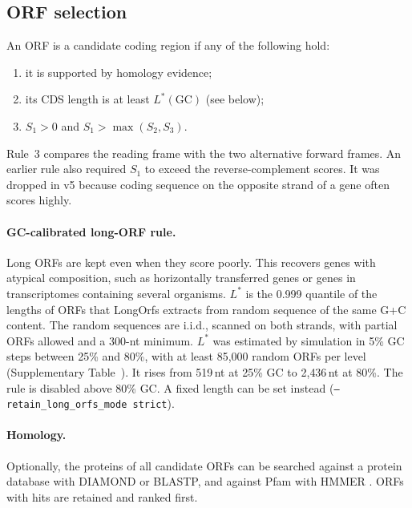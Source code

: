 \subsection{ORF selection}
An ORF is a candidate coding region if any of the following hold:
\begin{enumerate}
  \item it is supported by homology evidence;
  \item its CDS length is at least $L^\ast(\mathrm{GC})$ (see below);
  \item $S_1>0$ and $S_1>\max(S_2,S_3)$.
\end{enumerate}
Rule~3 compares the reading frame with the two alternative forward frames. An earlier rule also
required $S_1$ to exceed the reverse-complement scores. It was dropped in v5 because coding
sequence on the opposite strand of a gene often scores highly. 

\paragraph{GC-calibrated long-ORF rule.} Long ORFs are kept even when they score poorly. This
recovers genes with atypical composition, such as horizontally transferred genes or genes in
transcriptomes containing several organisms. $L^\ast$ is the 0.999 quantile of the lengths of ORFs
that LongOrfs extracts from random sequence of the same G+C content. The random sequences are
i.i.d., scanned on both strands, with partial ORFs allowed and a 300-nt minimum. $L^\ast$ was
estimated by simulation in 5\% GC steps between 25\% and 80\%, with at least 85{,}000 random ORFs per
level (Supplementary Table~). It rises from 519\,nt at 25\% GC to 2{,}436\,nt at 80\%. The
rule is disabled above 80\% GC. A fixed length can be set instead
(\texttt{--retain\_long\_orfs\_mode strict}).

\paragraph{Homology.} Optionally, the proteins of all candidate ORFs can be searched against a
protein database with DIAMOND \citep{Buchfink2021} or BLASTP, and against Pfam \citep{Mistry2021}
with HMMER \citep{Eddy2011}. ORFs with hits are retained and ranked first.

